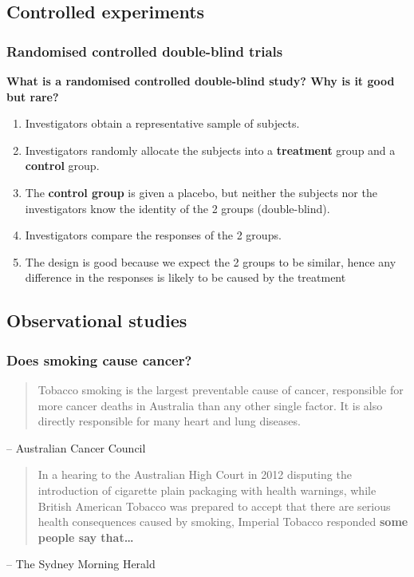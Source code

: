 \documentclass[a4paper]{article}
\begin{document}
\subsection{Controlled experiments}
\subsubsection{Randomised controlled double-blind trials}
\begin{greenbox}
	\textbf{What is a randomised controlled double-blind study? Why is it good but rare?}
\end{greenbox}
\begin{enumerate}
	\item Investigators obtain a representative sample of subjects.
	\item Investigators randomly allocate the subjects into a \textbf{\textcolor{mygreen}{treatment}} group and a \textbf{\textcolor{myred}{control}} group.
	\item The \textbf{\textcolor{myred}{control group}} is given a placebo, but neither the subjects nor the investigators know the identity of the 2 groups (double-blind).
	\item Investigators compare the responses of the 2 groups.
	\item The design is good because we expect the 2 groups to be similar, hence any difference in the responses is likely to be caused by the treatment
\end{enumerate}
\subsection{Observational studies}
\subsubsection{Does smoking cause cancer?}
\begin{tcolorbox}[bluestyleline]
	\blockquote{Tobacco smoking is the largest preventable cause of cancer, responsible for more cancer deaths in Australia than any other single factor. It is also directly responsible for many heart and lung diseases.}
	-- Australian Cancer Council
\end{tcolorbox}
\begin{tcolorbox}[bluestyleline]
	\blockquote{In a hearing to the Australian High Court in 2012 disputing the introduction of cigarette plain packaging with health warnings, while British American Tobacco was prepared to accept that there are serious health consequences caused by smoking, Imperial Tobacco responded \textbf{some people say that\dots}}
	-- The Sydney Morning Herald
\end{tcolorbox}
\end{document}
